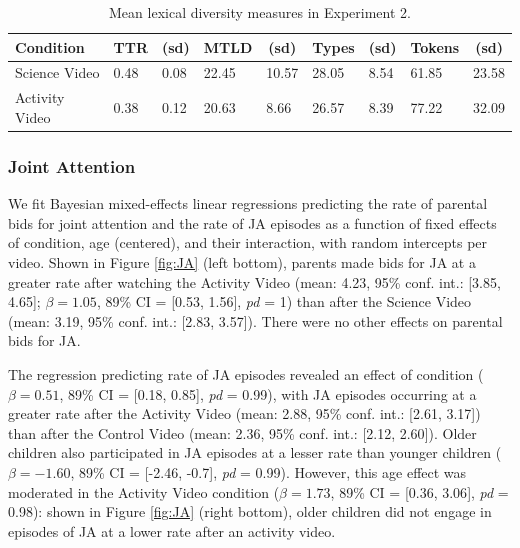 \documentclass[man,floatsintext]{apa6}
\begin{document}
\begin{table}[tbp]
\begin{center}
\begin{threeparttable}
\caption{\label{tab:e2tab}Mean lexical diversity measures in Experiment 2.}
\begin{tabular}{lllllllll}
\toprule
Condition & \multicolumn{1}{c}{TTR} & \multicolumn{1}{c}{(sd)} & \multicolumn{1}{c}{MTLD} & \multicolumn{1}{c}{(sd)} & \multicolumn{1}{c}{Types} & \multicolumn{1}{c}{(sd)} & \multicolumn{1}{c}{Tokens} & \multicolumn{1}{c}{(sd)}\\
\midrule
Science Video & 0.48 & 0.08 & 22.45 & 10.57 & 28.05 & 8.54 & 61.85 & 23.58\\
Activity Video & 0.38 & 0.12 & 20.63 & 8.66 & 26.57 & 8.39 & 77.22 & 32.09\\
\bottomrule
\end{tabular}
\end{threeparttable}
\end{center}
\end{table}

\hypertarget{joint-attention-1}{%
\subsubsection{Joint Attention}\label{joint-attention-1}}

We fit Bayesian mixed-effects linear regressions predicting the rate of parental bids for joint attention and the rate of JA episodes as a function of fixed effects of condition, age (centered), and their interaction, with random intercepts per video.
Shown in Figure \ref{fig:JA} (left bottom), parents made bids for JA at a greater rate after watching the Activity Video (mean: 4.23, 95\% conf. int.: {[}3.85, 4.65{]}; \(\beta=1.05\), 89\% CI = {[}0.53, 1.56{]}, \emph{pd} = 1) than after the Science Video (mean: 3.19, 95\% conf. int.: {[}2.83, 3.57{]}).
There were no other effects on parental bids for JA.

The regression predicting rate of JA episodes revealed an effect of condition (\(\beta=0.51\), 89\% CI = {[}0.18, 0.85{]}, \emph{pd} = 0.99), with JA episodes occurring at a greater rate after the Activity Video (mean: 2.88, 95\% conf. int.: {[}2.61, 3.17{]}) than after the Control Video (mean: 2.36, 95\% conf. int.: {[}2.12, 2.60{]}).
Older children also participated in JA episodes at a lesser rate than younger children (\(\beta=-1.60\), 89\% CI = {[}-2.46, -0.7{]}, \emph{pd} = 0.99).
However, this age effect was moderated in the Activity Video condition (\(\beta=1.73\), 89\% CI = {[}0.36, 3.06{]}, \emph{pd} = 0.98): shown in Figure \ref{fig:JA} (right bottom), older children did not engage in episodes of JA at a lower rate after an activity video.
\end{document}
